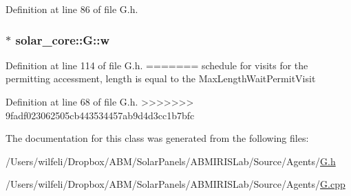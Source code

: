 Definition at line 86 of file G.\+h.

\hypertarget{classsolar__core_1_1_g_a7239d05d617261f97c46b641a0229c14}{}
\subsubsection[{w}]{$\ast$ solar\+\_\+core\+::\+G\+::w\hspace{0.3cm}{\ttfamily [protected]}}\label{classsolar__core_1_1_g_a7239d05d617261f97c46b641a0229c14}


Definition at line 114 of file G.\+h.
=======
schedule for visits for the permitting accessment, length is equal to the Max\+Length\+Wait\+Permit\+Visit 

Definition at line 68 of file G.\+h.
>>>>>>> 9fadf023062505cb443534457ab9d4d3cc1b7bfc



The documentation for this class was generated from the following files\+:\begin{DoxyCompactItemize}
\item 
/\+Users/wilfeli/\+Dropbox/\+A\+B\+M/\+Solar\+Panels/\+A\+B\+M\+I\+R\+I\+S\+Lab/\+Source/\+Agents/\hyperlink{_g_8h}{G.\+h}\item 
/\+Users/wilfeli/\+Dropbox/\+A\+B\+M/\+Solar\+Panels/\+A\+B\+M\+I\+R\+I\+S\+Lab/\+Source/\+Agents/\hyperlink{_g_8cpp}{G.\+cpp}\end{DoxyCompactItemize}
